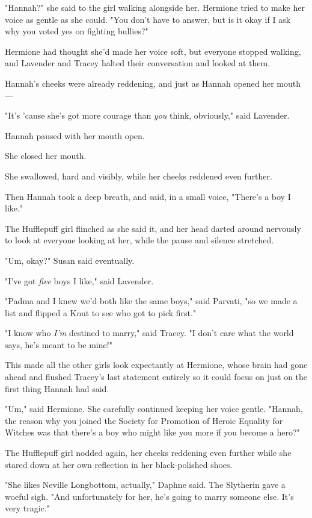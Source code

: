 "Hannah?" she said to the girl walking alongside her. Hermione tried to make 
her voice as gentle as she could. "You don't have to answer, but is it okay if 
I ask why you voted yes on fighting bullies?"

Hermione had thought she'd made her voice soft, but everyone stopped walking, 
and Lavender and Tracey halted their conversation and looked at them.

Hannah's cheeks were already reddening, and just as Hannah opened her mouth---

"It's 'cause she's got more courage than \emph{you} think, obviously," said 
Lavender.

Hannah paused with her mouth open.

She closed her mouth.

She swallowed, hard and visibly, while her cheeks reddened even further.

Then Hannah took a deep breath, and said, in a small voice, "There's a boy I 
like."

The Hufflepuff girl flinched as she said it, and her head darted around 
nervously to look at everyone looking at her, while the pause and silence 
stretched.

"Um, okay?" Susan said eventually.

"I've got \emph{five} boys I like," said Lavender.

"Padma and I knew we'd both like the same boys," said Parvati, "so we made a 
list and flipped a Knut to see who got to pick first."

"I know who \emph{I'm} destined to marry," said Tracey. "I don't care what the 
world says, he's meant to be mine!"

This made all the other girls look expectantly at Hermione, whose brain had 
gone ahead and flushed Tracey's last statement entirely so it could focus on 
just on the first thing Hannah had said.

"Um," said Hermione. She carefully continued keeping her voice gentle. "Hannah, 
the reason why you joined the Society for Promotion of Heroic Equality for 
Witches was that there's a boy who might like you more if you become a hero?"

The Hufflepuff girl nodded again, her cheeks reddening even further while she 
stared down at her own reflection in her black-polished shoes.

"She likes Neville Longbottom, actually," Daphne said. The Slytherin gave a 
woeful sigh. "And unfortunately for her, he's going to marry someone else. It's 
very tragic."

